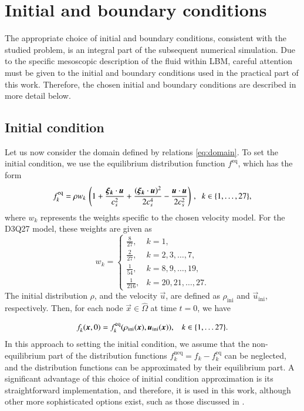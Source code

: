 \section{Initial and boundary conditions}\label{pocatecni a okrajove podminky}

The appropriate choice of initial and boundary conditions, consistent with the studied problem, is an integral part of the subsequent numerical simulation. Due to the specific mesoscopic description of the fluid within LBM, careful attention must be given to the initial and boundary conditions used in the practical part of this work. Therefore, the chosen initial and boundary conditions are described in more detail below.

\subsection{Initial condition}\label{pocatecni podminka}
Let us now consider the domain defined by relations \eqref{eq:domain}. To set the initial condition, we use the equilibrium distribution function \( f^{\mathrm{eq}} \), which has the form
\begin{equation}\label{eq:feq}
	f^{\mathrm{eq}}_{k} = \rho w_{k} \, \left(1 + \frac{\vec{\xi_{k}} \cdot \vec{u}}{c^{2}_{s}} + \frac{(\vec{\xi_{k}} \cdot \vec{u})^2}{2c^{4}_{s}} - \frac{\vec{u} \cdot \vec{u}}{2c^{2}_{s}} \right)\, , \hspace{2mm} k \in \{1,\dots,27\},
\end{equation}
where \( w_{k} \) represents the weights specific to the chosen velocity model. For the D3Q27 model, these weights are given as \cite{Kruger}
\begin{equation}
	w_k= \begin{cases}\frac{8}{27}, & k=1, \\ \frac{2}{27}, & k = 2,3, \ldots, 7, \\ \frac{1}{54}, & k = 8,9, \ldots, 19, \\ \frac{1}{216}, & k = 20,21, \ldots, 27.\end{cases}
\end{equation}
The initial distribution \( \rho \), and the velocity \( \vec{u} \), are defined as \( \rho _{\mathrm{ini}} \) and \( \vec{u} _{\mathrm{ini}} \), respectively. Then, for each node \( \vec{x} \in \hat{\Omega} \) at time \( t=0 \), we have

\begin{equation}\label{eq:initial condition}
	f^{}_{k} (\vec{x}, 0) = f^{\mathrm{eq}}_{k} (\rho _{\mathrm{ini}} (\vec{x}), \vec{u} _{\mathrm{ini}} (\vec{x})), \hspace{3mm} k \in \{1, \dots 27\}.
\end{equation}
In this approach to setting the initial condition, we assume that the non-equilibrium part of the distribution functions \( f^{\mathrm{neq}}_{k} = f_{k} - f^{\mathrm{eq}}_{k} \) can be neglected, and the distribution functions can be approximated by their equilibrium part. A significant advantage of this choice of initial condition approximation is its straightforward implementation, and therefore, it is used in this work, although other more sophisticated options exist, such as those discussed in \cite{PE}.


